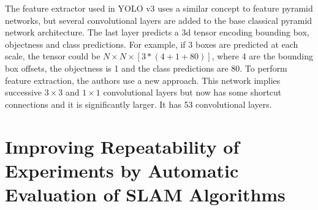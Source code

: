 The feature extractor used in YOLO v3 uses a similar concept to feature pyramid networks, but several convolutional layers are added to the base classical pyramid network architecture. The last layer predicts a 3d tensor encoding bounding box, objectness and class predictions. For example, if 3 boxes are predicted at each scale, the tensor could be $ N \times N \times [3 \ast (4 + 1 + 80)] $, where 4 are the bounding box offsets, the objectness is 1 and the class predictions are 80. 
To perform feature extraction, the authors use a new approach. This network implies successive $3 \times 3$ and $1 \times 1 $
convolutional layers but now has some shortcut connections and it is significantly larger. It has 53 convolutional layers.

\newpage 

\section{Improving Repeatability of Experiments
	by Automatic Evaluation of SLAM Algorithms \cite{8594189}}


